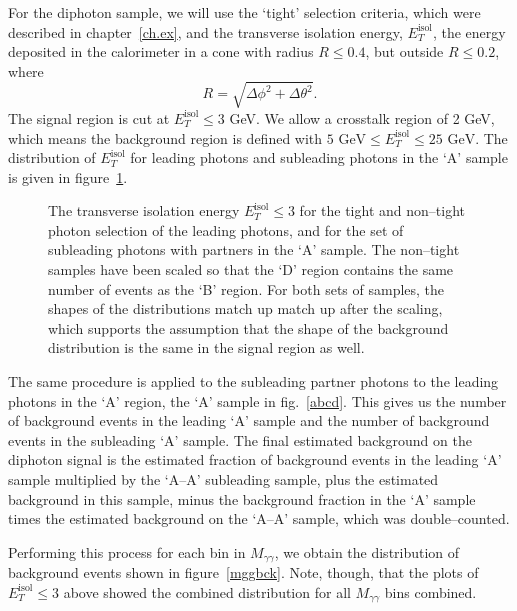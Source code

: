 For the diphoton sample, we will use the `tight' selection criteria, which were described in chapter~\ref{ch.ex}, and the transverse isolation energy, $E_T^{\text{isol}}$, the energy deposited in the calorimeter in a cone with radius $R\le0.4$, but outside $R\le0.2$, where
\[R=\sqrt{\Delta\phi^2+\Delta\theta^2}.\]
The signal region is cut at $E_T^{\text{isol}}\le3$ GeV. We allow a crosstalk region of 2 GeV, which means the background region is defined with $5\text{ GeV}\le E_T^{\text{isol}}\le25\text{ GeV}$. The distribution of $E_T^{\text{isol}}$ for leading photons and subleading photons in the `A' sample is given in figure~\ref{etiso}.

\begin{figure}[htp]
\begin{minipage}[b]{.69\textwidth}
\begin{infilsf} \tiny 

\end{infilsf}
\end{minipage}\hfill\begin{minipage}[b]{.3\textwidth}
\caption{The transverse isolation energy $E_T^{\text{isol}}\le3$ for the tight and non--tight photon selection of the leading photons, and for the set of subleading photons with partners in the `A' sample. The non--tight samples have been scaled so that the `D' region contains the same number of events as the `B' region. For both sets of samples, the shapes of the distributions match up match up after the scaling, which supports the assumption that the shape of the background distribution is the same in the signal region as well.
\label{etiso}}
\end{minipage}
\end{figure}

The same procedure is applied to the subleading partner photons to the leading photons in the `A' region, the `A' sample in fig.~\ref{abcd}. This gives us the number of background events in the leading `A' sample and the number of background events in the subleading `A' sample. The final estimated background on the diphoton signal is the estimated fraction of background events in the leading `A' sample multiplied by the `A--A' subleading sample, plus the estimated background in this sample, minus the background fraction in the `A' sample times the estimated background on the `A--A' sample, which was double--counted.

Performing this process for each bin in $M_{\gamma\gamma}$, we obtain the distribution of background events shown in figure~\ref{mggbck}. Note, though, that the plots of $E_T^{\text{isol}}\le3$ above showed the combined distribution for all $M_{\gamma\gamma}$ bins combined.

